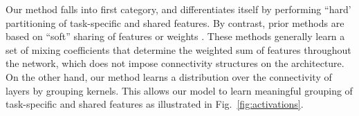 Our method falls into first category, and differentiates itself by performing ``hard' partitioning of task-specific and shared features. By contrast, prior methods are based on ``soft'' sharing of features \cite{MisraCrossMTL16,Ruder2019SluiceNL} or weights \cite{long2017learning,meyerson2018beyond}. These methods generally learn a set of mixing coefficients that determine the weighted sum of features throughout the network, which does not impose connectivity structures on the architecture. On the other hand, our method learns a distribution over the connectivity of layers by grouping kernels. This allows our model to learn meaningful grouping of task-specific and shared features as illustrated in Fig.~\ref{fig:activations}. 












    

